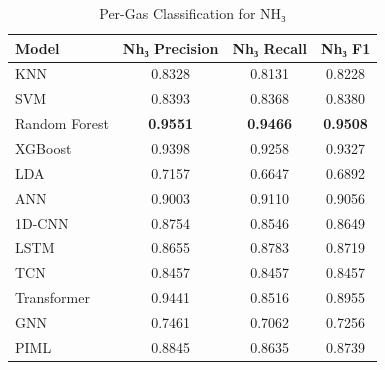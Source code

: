 \begin{table}[htbp]
\centering
\caption{Per-Gas Classification for NH₃}
\label{tab:NH₃_detail}
\begin{tabular}{lccc}
\toprule
Model & Nh₃ Precision & Nh₃ Recall & Nh₃ F1 \\
\midrule
KNN & 0.8328 & 0.8131 & 0.8228 \\
SVM & 0.8393 & 0.8368 & 0.8380 \\
Random Forest & \textbf{0.9551} & \textbf{0.9466} & \textbf{0.9508} \\
XGBoost & 0.9398 & 0.9258 & 0.9327 \\
LDA & 0.7157 & 0.6647 & 0.6892 \\
ANN & 0.9003 & 0.9110 & 0.9056 \\
1D-CNN & 0.8754 & 0.8546 & 0.8649 \\
LSTM & 0.8655 & 0.8783 & 0.8719 \\
TCN & 0.8457 & 0.8457 & 0.8457 \\
Transformer & 0.9441 & 0.8516 & 0.8955 \\
GNN & 0.7461 & 0.7062 & 0.7256 \\
PIML & 0.8845 & 0.8635 & 0.8739 \\
\bottomrule
\end{tabular}
\end{table}